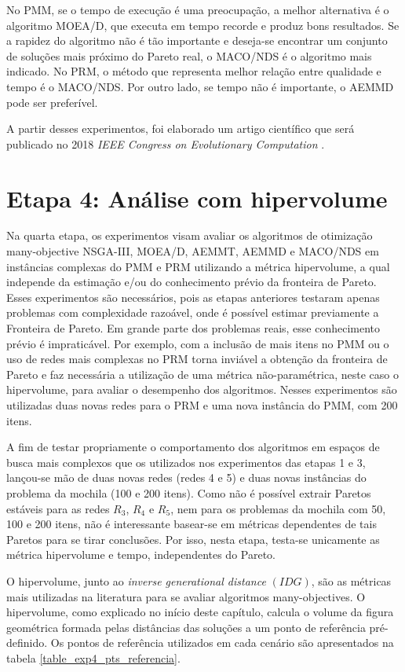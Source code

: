 No PMM, se o tempo de execução é uma preocupação, a melhor alternativa é o algoritmo MOEA/D, que executa em tempo recorde e produz bons resultados. Se a rapidez do algoritmo não é tão importante e deseja-se encontrar um conjunto de soluções mais próximo do Pareto real, o MACO/NDS é o algoritmo mais indicado. No PRM, o método que representa melhor relação entre qualidade e tempo é o MACO/NDS. Por outro lado, se tempo não é importante, o AEMMD pode ser preferível.

A partir desses experimentos, foi elaborado um artigo científico que será publicado no 2018 \textit{IEEE Congress on Evolutionary Computation} \cite{Franca2018}.

\section{Etapa 4: Análise com hipervolume}
\label{section_experimentos_etapa4}

Na quarta etapa, os experimentos visam avaliar os algoritmos de otimização many-objective NSGA-III, MOEA/D, AEMMT, AEMMD e MACO/NDS em instâncias complexas do PMM e PRM utilizando a métrica hipervolume, a qual independe da estimação e/ou do conhecimento prévio da fronteira de Pareto. Esses experimentos são necessários, pois as etapas anteriores testaram apenas problemas com complexidade razoável, onde é possível estimar previamente a Fronteira de Pareto. Em grande parte dos problemas reais, esse conhecimento prévio é impraticável. Por exemplo, com a inclusão de mais itens no PMM ou o uso de redes mais complexas no PRM torna inviável a obtenção da fronteira de Pareto e faz necessária a utilização de uma métrica não-paramétrica, neste caso o hipervolume, para avaliar o desempenho dos algoritmos. Nesses experimentos são utilizadas duas novas redes para o PRM e uma nova instância do PMM, com 200 itens.

A fim de testar propriamente o comportamento dos algoritmos em espaços de busca mais complexos que os utilizados nos experimentos das etapas 1 e 3, lançou-se mão de duas novas redes (redes 4 e 5) e duas novas instâncias do problema da mochila (100 e 200 itens). Como não é possível extrair Paretos estáveis para as redes $R_3$, $R_4$ e $R_5$, nem para os problemas da mochila com 50, 100 e 200 itens, não é interessante basear-se em métricas dependentes de tais Paretos para se tirar conclusões. Por isso, nesta etapa, testa-se unicamente as métrica hipervolume e tempo, independentes do Pareto.

O hipervolume, junto ao \textit{inverse generational distance} $(IDG)$, são as métricas mais utilizadas na literatura para se avaliar algoritmos many-objectives. O hipervolume, como explicado no início deste capítulo, calcula o volume da figura geométrica formada pelas distâncias das soluções a um ponto de referência pré-definido. Os pontos de referência utilizados em cada cenário são apresentados na tabela \ref{table_exp4_pts_referencia}.

